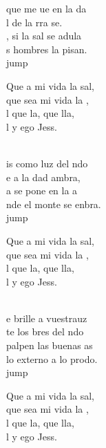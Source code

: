 \begin{cancion}%
	 que me ue en la da\\
	l de la rra se. \\
	, si la sal se adula\\
	s hombres la pisan.\\jump\\
	\begin{chorus}%
	Que a mi vida la sal,\\
	que sea mi vida la ,\\
	l que la,  que lla,\\
	l y ego Jess.\\
	\end{chorus}%
	\jump\\
	is como luz del ndo\\
	e a la dad ambra,\\
	a se pone en la a\\
	nde el monte se enbra.\\jump\\
	\begin{chorus}%
	Que a mi vida la sal,\\
	que sea mi vida la ,\\
	l que la,  que lla,\\
	l y ego Jess.\\
	\end{chorus}%
	\jump\\
	e brille a vuestrauz\\
	te los bres del ndo\\
	 palpen las buenas as\\
	 lo externo a lo prodo.\\jump\\
	\begin{chorus}%
	Que a mi vida la sal,\\
	que sea mi vida la ,\\
	l que la,  que lla,\\
	l y ego Jess.\\
	\end{chorus}%
	\jump\\
\end{cancion}%
